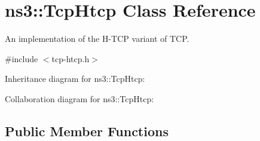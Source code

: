 \hypertarget{classns3_1_1TcpHtcp}{}\section{ns3\+:\+:Tcp\+Htcp Class Reference}
\label{classns3_1_1TcpHtcp}


An implementation of the H-\/\+T\+CP variant of T\+CP.  




{\ttfamily \#include $<$tcp-\/htcp.\+h$>$}



Inheritance diagram for ns3\+:\+:Tcp\+Htcp\+:


Collaboration diagram for ns3\+:\+:Tcp\+Htcp\+:
\subsection*{Public Member Functions}
